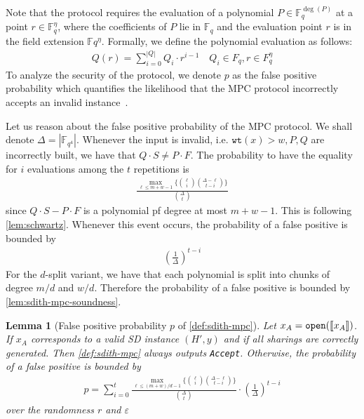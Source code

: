 \documentclass[11pt]{report}
\theoremstyle{definition}
\theoremstyle{plain}
\newtheorem{lemma}{Lemma}[section]
\begin{document}
Note that the protocol requires the evaluation of a polynomial $P \in \mathbb{F}_q^{\deg(P)}$ at a point $r \in \mathbb{F}_q^\eta$, where the coefficients of $P$ lie in $\mathbb{F}_q$ and the evaluation point $r$ is in the field extension $\mathbb{F}q^\eta$. Formally, we define the polynomial evaluation as follows:
\begin{align}
  Q(r)  = \textstyle\sum_{i=0}^{|Q|} Q_i \cdot r^{i-1}  \quad Q_i \in F_q, r \in F_q^\eta\label{eq:sdith_mpc_polynomial_eval}
\end{align}
To analyze the security of the protocol, we denote $p$ as the false positive probability which quantifies the likelihood that the MPC protocol incorrectly accepts an invalid instance~\cite{feneuil2022syndrome,aguilarsyndrome11}.

Let us reason about the false positive probability of the MPC protocol. We shall denote $\Delta = |\mathbb{F}_{q^4}|$. Whenever the input is invalid, i.e. $\texttt{wt}(x) > w, P, Q$ are incorrectly built, we have that $Q \cdot S \neq P \cdot F$. The probability to have the equality for $i$ evaluations among the $t$ repetitions is
\begin{align*}
  \frac{\max_{\ell \leq m + w -1} \{ \binom{\ell}{i} \binom{\Delta - \ell}{t-i} \}}{\binom{\Delta}{t}}
\end{align*}
since $Q\cdot S - P \cdot F$ is a polynomial pf degree at most $m + w -1$. This is following \autoref{lem:schwartz}. Whenever this event occurs, the probability of a false positive is bounded by
\begin{align*}
  \left(\frac{1}{\Delta}\right)^{t-i}
\end{align*}
For the $d$-split variant, we have that each polynomial is split into chunks of degree $m/d$ and $w/d$. Therefore the probability of a false positive is bounded by \autoref{lem:sdith-mpc-soundness}.

\begin{lemma}[False positive probability $p$ of \autoref{def:sdith-mpc}]\label{lem:sdith-mpc-soundness}
  Let $x_A = \texttt{open}(\llbracket x_A \rrbracket)$. If $x_A$ corresponds to a valid SD instance $(H', y)$ and if all sharings are correctly generated. Then \autoref{def:sdith-mpc} always outputs \texttt{Accept}. Otherwise, the probability of a false positive is bounded by
  \begin{align*}
    p = \sum_{i=0}^t \frac{\max_{\ell \leq (m + w)/d-1} \{ \binom{\ell}{i} \binom{\Delta - \ell}{t-i} \}}{\binom{\Delta}{t}} \cdot \left(\frac{1}{\Delta}\right)^{t-i}
  \end{align*} over the randomness $r$ and $\varepsilon$
\end{lemma}
\end{document}
